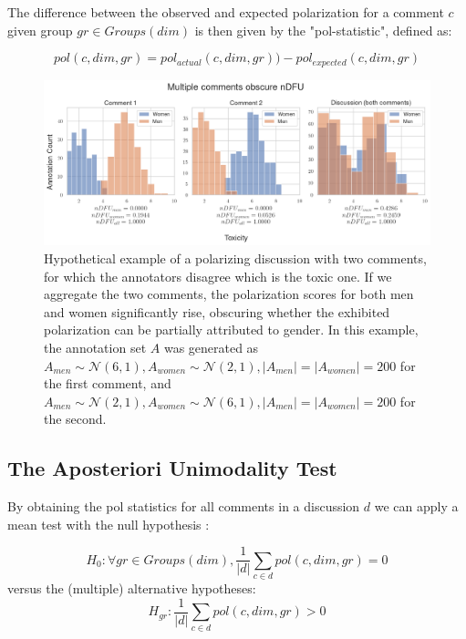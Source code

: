 \documentclass{article}
\newcommand{\sdbdim}{\textit{dim}}
\newcommand{\sdbgroup}{\textit{gr}}
\newcommand{\Sdbgroup}{\textit{Groups}}
\begin{document}
 The difference between the observed and expected polarization for a comment $c$ given group $\sdbgroup \in \Sdbgroup(\sdbdim)$ is then given by the "pol-statistic", defined as: 
 
 \begin{equation}
	\textit{pol}(c, \sdbdim, \sdbgroup)  = pol_{actual}(c, \sdbdim, \sdbgroup)) - pol_{expected}(c, \sdbdim, \sdbgroup)
\end{equation}

\begin{figure}[t]
	\centering
	\includegraphics[width=\linewidth]{ndfu_multi_comments.png}
	\caption{Hypothetical example of a polarizing discussion with two comments, for which the annotators disagree which is the toxic one. If we aggregate the two comments, the polarization scores for both men and women significantly rise, obscuring whether the exhibited polarization can be partially attributed to gender. In this example, the annotation set $A$ was generated as $A_{men} \sim \mathcal{N}(6, 1), A_{women} \sim \mathcal{N}(2, 1), \lvert A_{men} \rvert = \lvert A_{women} \rvert = 200$ for the first comment, and $A_{men} \sim \mathcal{N}(2, 1), A_{women} \sim \mathcal{N}(6, 1), \lvert A_{men} \rvert = \lvert A_{women} \rvert = 200$ for the second.}
	\label{fig:ndfu_multi_comment}
\end{figure}



\subsection{The Aposteriori Unimodality Test}
\label{ssec:methodology:aposteriori}

By obtaining the pol statistics for all comments in a discussion $d$ we can apply a mean test with the null hypothesis :

\begin{equation}
	H_0: \forall \sdbgroup \in \Sdbgroup(\sdbdim), \frac{1}{\lvert d \rvert} \sum\limits_{c \in d} pol(c, \sdbdim,  \sdbgroup) = 0
\end{equation}
\noindent versus the (multiple) alternative hypotheses: 
\begin{equation}
	H_{\sdbgroup}:\frac{1}{\lvert d \rvert} \sum\limits_{c \in d}  pol(c, \sdbdim, \sdbgroup) >  0
\end{equation}
\end{document}
